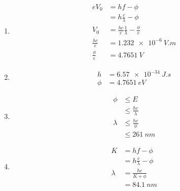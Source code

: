 \documentclass{article}
\begin{document}
\begin{enumerate}
  \item

        \begin{align*}
          e V_0          & = h f - \phi                                       \\
                         & = h \frac{c}{\lambda} - \phi                       \\
          V_0            & = \frac{h c}{e} \frac{1}{\lambda} - \frac{\phi}{e} \\
          \frac{h c}{e}  & = \qty{1.232e-6}{V.m}                              \\
          \frac{\phi}{e} & = \qty{4.7651}{V}
        \end{align*}

  \item

        \begin{align*}
          h    & = \qty{6.57e-34}{J.s} \\
          \phi & = \qty{4.7651}{eV}
        \end{align*}

  \item

        \begin{align*}
          \phi    & \le E                   \\
                  & \le \frac{h c}{\lambda} \\
          \lambda & \le \frac{h c}{\phi}    \\
                  & \le \qty{261}{nm}
        \end{align*}

  \item

        \begin{align*}
          K       & = h f - \phi                 \\
                  & = h \frac{c}{\lambda} - \phi \\
          \lambda & = \frac{h c}{K + \phi}       \\
                  & = \qty{84.1}{nm}
        \end{align*}
\end{enumerate}

\setcounter{subsubsection}{38}
\subsubsection{}
\end{document}
